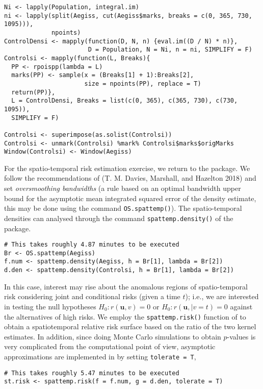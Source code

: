 \begin{verbatim}
Ni <- lapply(Population, integral.im)
ni <- lapply(split(Aegiss, cut(Aegiss$marks, breaks = c(0, 365, 730, 1095))), 
             npoints)
ControlDensi <- mapply(function(D, N, n) {eval.im((D / N) * n)}, 
                       D = Population, N = Ni, n = ni, SIMPLIFY = F)
Controlsi <- mapply(function(L, Breaks){
  PP <- rpoispp(lambda = L)
  marks(PP) <- sample(x = (Breaks[1] + 1):Breaks[2], 
                      size = npoints(PP), replace = T)
  return(PP)}, 
  L = ControlDensi, Breaks = list(c(0, 365), c(365, 730), c(730, 1095)), 
  SIMPLIFY = F)

Controlsi <- superimpose(as.solist(Controlsi))
Controlsi <- unmark(Controlsi) %mark% Controlsi$marks$origMarks
Window(Controlsi) <- Window(Aegiss)
\end{verbatim}

For the spatio-temporal risk estimation exercise, we return to the  package. We follow the recommendations of (T. M. Davies, Marshall, and Hazelton 2018) and set \emph{oversmoothing bandwidths} (a rule based on an optimal bandwidth upper bound for the asymptotic mean integrated squared error of the density estimate, this may be done using the command \texttt{OS.spattemp()}). The spatio-temporal densities can analysed through the command \texttt{spattemp.density()} of the  package.

\begin{verbatim}
# This takes roughly 4.87 minutes to be executed
Br <- OS.spattemp(Aegiss)
f.num <- spattemp.density(Aegiss, h = Br[1], lambda = Br[2])
d.den <- spattemp.density(Controlsi, h = Br[1], lambda = Br[2])
\end{verbatim}

In this case, interest may rise about the anomalous regions of spatio-temporal risk considering joint and conditional risks (given a time \(t\)); i.e., we are interested in testing the null hypotheses \(H_0:r(\mathbf{u},v)=0\) or \(H_0:r(\mathbf{u},|v=t)=0\) against the alternatives of high risks. We employ the \texttt{spattemp.risk()} function of  to obtain a spatiotemporal relative risk surface based on the ratio of the two kernel estimates. In addition, since doing Monte Carlo simulations to obtain \(p\)-values is very complicated from the computational point of view, asymptotic approximations are implemented in  by setting \texttt{tolerate\ =\ T},

\begin{verbatim}
# This takes roughly 5.47 minutes to be executed
st.risk <- spattemp.risk(f = f.num, g = d.den, tolerate = T)
\end{verbatim}

